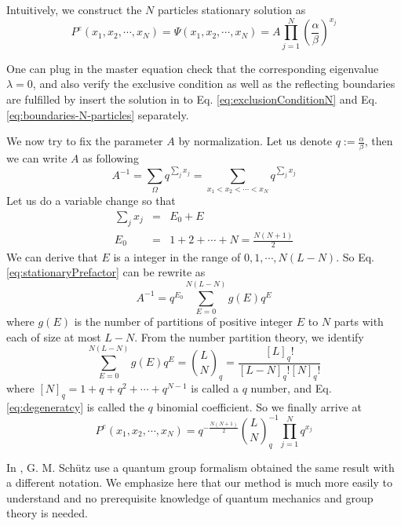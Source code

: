 \documentclass[12pt,a4paper]{article}
\begin{document}
Intuitively, we construct the $N$ particles stationary solution as
\begin{equation}
    \label{eq:stationaryN}
    P^e(x_1, x_2, \cdots, x_N) = \Psi(x_1, x_2, \cdots, x_N) =  A
    \prod_{j=1}^N\left(\frac{\alpha}{\beta}\right)^{x_j}
\end{equation}

One can plug in the master equation check that the corresponding eigenvalue
$\lambda= 0$, and also verify the exclusive condition as well as the reflecting
boundaries are fulfilled by insert the solution in to Eq.
\eqref{eq:exclusionConditionN} and Eq. \eqref{eq:boundaries-N-particles}
separately.

We now try to fix the parameter $A$ by normalization. Let us denote
$q:=\frac{\alpha}{\beta}$, then we can write $A$ as following
\begin{equation}
    \label{eq:stationaryPrefactor}
    A^{-1} = \sum_{\Omega} q^{\sum_j{x_j}} = 
    \sum_{x_1 < x_2 < \cdots < x_N} q^{\sum_j{x_j}}
\end{equation}
Let us do a variable change so that 
\begin{eqnarray*}
    \sum_j{x_j} &=& E_0 + E \\
    E_0 &=& 1 + 2 + \cdots + N = \frac{N(N+1)}{2}
\end{eqnarray*}
We can derive that $E$ is a integer in the range of $0, 1, \cdots, N(L-N)$. So
Eq. \eqref{eq:stationaryPrefactor} can be rewrite as 
\begin{equation}
    \label{eq:prefactorRewrite}
    A^{-1} = q^{E_0}\sum_{E=0}^{N(L-N)}g(E)q^E
\end{equation}
where $g(E)$ is the number of partitions of positive integer $E$ to $N$ parts
with each of size at most $L-N$. From the number partition theory, we identify
\begin{equation}
    \label{eq:degeneratcy}
    \sum_{E=0}^{N(L-N)}g(E)q^E = \binom{L}{N}_q =
    \frac{[L]_q!}{[L-N]_q![N]_q!}
\end{equation}
where $[N]_q = 1 + q + q^2 + \cdots + q^{N-1}$ is called a $q$ number, and Eq.
\eqref{eq:degeneratcy} is called the $q$ binomial coefficient\cite{}.
So we finally arrive at 
\begin{equation}
    \label{eq:stationarySolutionN}
    P^e(x_1, x_2, \cdots, x_N) = q^{-\frac{N(N+1)}{2}}
    \binom{L}{N}_q^{-1}\prod_{j=1}^N{q^{x_j}}
\end{equation}

In \cite{}, G. M. Sch\"{u}tz use a quantum group formalism obtained the same
result with a different notation. We emphasize here that our method is much more
easily to understand and no prerequisite knowledge of quantum mechanics and
group theory is needed.
\end{document}
